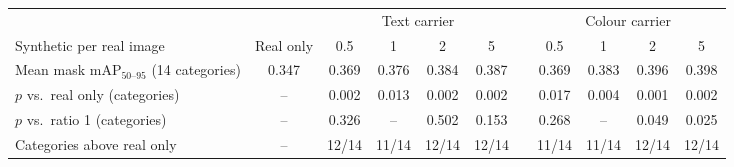 \begin{tabular}{@{}l c cccc c cccc@{}}
\toprule
 & & \multicolumn{4}{c}{Text carrier} & & \multicolumn{4}{c}{Colour carrier} \\
\cmidrule(lr){3-6}\cmidrule(lr){8-11}
Synthetic per real image & Real only & 0.5 & 1 & 2 & 5 & & 0.5 & 1 & 2 & 5 \\
\midrule
Mean mask mAP$_{50\text{--}95}$ (14 categories) & 0.347 & 0.369 & 0.376 & 0.384 & 0.387 & & 0.369 & 0.383 & 0.396 & 0.398 \\
$p$ vs.\ real only (categories) & -- & 0.002 & 0.013 & 0.002 & 0.002 & & 0.017 & 0.004 & 0.001 & 0.002 \\
$p$ vs.\ ratio 1 (categories) & -- & 0.326 & -- & 0.502 & 0.153 & & 0.268 & -- & 0.049 & 0.025 \\
Categories above real only & -- & 12/14 & 11/14 & 12/14 & 12/14 & & 11/14 & 11/14 & 12/14 & 12/14 \\
\bottomrule
\end{tabular}
